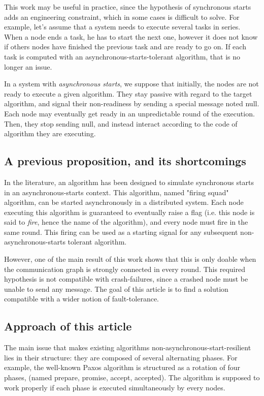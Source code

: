 \documentclass{article}
\begin{document}
This work may be useful in practice, since the hypothesis of synchronous starts adds an engineering constraint, which in some cases is difficult to solve.
For example, let's assume that a system needs to execute several tasks in series.
When a node ends a task, he has to start the next one, however it does not know if others nodes have finished the previous task and are ready to go on.
If each task is computed with an asynchronous-starts-tolerant algorithm, that is no longer an issue.

In a system with \textit{asynchronous starts}, we suppose that initially, the nodes are not ready to execute a given algorithm. They stay passive with regard to the target algorithm, 
and signal their non-readiness by sending a special message noted null. Each node may eventually get ready in an unpredictable round of the execution.
Then, they stop sending null, and instead interact according to the code of algorithm they are executing.

\subsection{A previous proposition, and its shortcomings}

In the literature, an algorithm has been designed to simulate synchronous starts in an asynchronous-starts context.
This algorithm, named "firing squad" algorithm, can be started asynchronously in a distributed system.
Each node executing this algorithm is guaranteed to eventually raise a flag (i.e. this node is said to \textit{fire}, hence the name of the algorithm), and every node must fire in the same round.
This firing can be used as a starting signal for any subsequent non-asynchronous-starts tolerant algorithm.

However, one of the main result of this work shows that this is only doable when the communication graph is strongly connected in every round.
This required hypothesis is not compatible with crash-failures, since a crashed node must be unable to send any message.
The goal of this article is to find a solution compatible with a wider notion of fault-tolerance.

\subsection{Approach of this article}

The main issue that makes existing algorithms non-asynchronous-start-resilient lies in their structure:
they are composed of several alternating phases.
For example, the well-known Paxos \cite{paxos} algorithm is structured as a rotation of four phases, (named prepare,
promise, accept, accepted).
The algorithm is supposed to work properly if each phase is executed simultaneously by every nodes.
\end{document}
